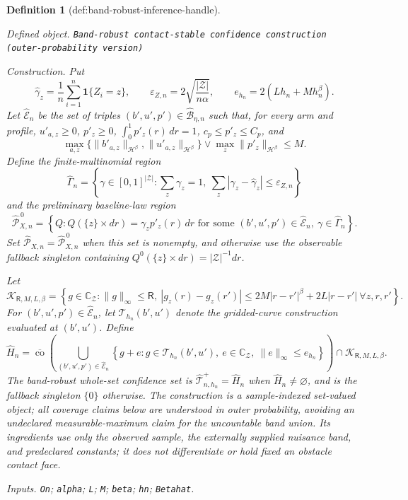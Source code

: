 \documentclass{article}
\newtheorem{definition}{Definition}
\begin{document}
\begin{definition}[def:band-robust-inference-handle]\label{def:band-robust-inference-handle}
\par\smallskip\noindent\emph{Defined object.} \texttt{Band-\allowbreak{}robust contact-\allowbreak{}stable confidence construction (outer-\allowbreak{}probability version)}
\par\smallskip\noindent\emph{Construction.} Put
\[
\widehat\gamma_z=\frac1n\sum_{i=1}^n\mathbf 1\{Z_i=z\},
\qquad
\varepsilon_{Z,n}=2\sqrt{\frac{|\mathcal Z|}{n\alpha}},
\qquad
e_{h_n}=2(Lh_n+Mh_n^\beta).
\]
Let \(\widehat{\mathcal E}_n\) be the set of triples \((b',u',p')\in\widehat{\mathcal B}_{\eta,n}\) such that, for every arm and profile, \(u'_{a,z}\geq0\), \(p'_z\geq0\), \(\int_0^1p'_z(r)\,dr=1\), \(c_p\leq p'_z\leq C_p\), and
\[
\max_{a,z}\{\|b'_{a,z}\|_{\mathcal H^\beta},\|u'_{a,z}\|_{\mathcal H^\beta}\}
\vee\max_z\|p'_z\|_{\mathcal H^\beta}\leq M.
\]
Define the finite-multinomial region
\[
\widehat\Gamma_n=
\left\{\gamma\in[0,1]^{|\mathcal Z|}:\sum_z\gamma_z=1,
\ \sum_z|\gamma_z-\widehat\gamma_z|\leq\varepsilon_{Z,n}\right\}
\]
and the preliminary baseline-law region
\[
\widehat{\mathcal P}^{\,0}_{X,n}
=\left\{Q:Q(\{z\}\times dr)=\gamma_zp'_z(r)\,dr
\text{ for some }(b',u',p')\in\widehat{\mathcal E}_n,
\ \gamma\in\widehat\Gamma_n\right\}.
\]
Set \(\widehat{\mathcal P}_{X,n}=\widehat{\mathcal P}^{\,0}_{X,n}\) when this set is nonempty, and otherwise use the observable fallback singleton containing \(Q^0(\{z\}\times dr)=|\mathcal Z|^{-1}dr\).

Let
\[
\mathcal K_{\mathsf R,M,L,\beta}
=\left\{g\in\mathbb C_{\mathcal Z}:\|g\|_\infty\leq\mathsf R,
\ |g_z(r)-g_z(r')|
\leq2M|r-r'|^\beta+2L|r-r'|\ \forall z,r,r'\right\}.
\]
For \((b',u',p')\in\widehat{\mathcal E}_n\), let \(\mathcal T_{h_n}(b',u')\) denote the gridded-curve construction evaluated at \((b',u')\).  Define
\[
\widehat H_n=
\overline{\operatorname{co}}\!\left(
\bigcup_{(b',u',p')\in\widehat{\mathcal E}_n}
\left\{g+e:g\in\mathcal T_{h_n}(b',u'),\ e\in\mathbb C_{\mathcal Z},\
\|e\|_\infty\leq e_{h_n}\right\}\right)
\cap\mathcal K_{\mathsf R,M,L,\beta}.
\]
The band-robust whole-set confidence set is \(\widehat{\mathcal T}_{n,h_n}^{+}=\widehat H_n\) when \(\widehat H_n\neq\varnothing\), and is the fallback singleton \(\{0\}\) otherwise.  The construction is a sample-indexed set-valued object; all coverage claims below are understood in outer probability, avoiding an undeclared measurable-maximum claim for the uncountable band union. Its ingredients use only the observed sample, the externally supplied nuisance band, and predeclared constants; it does not differentiate or hold fixed an obstacle contact face.
\par\smallskip\noindent\emph{Inputs.} \texttt{On}; \texttt{alpha}; \texttt{L}; \texttt{M}; \texttt{beta}; \texttt{hn}; \texttt{Betahat}.
\end{definition}
\end{document}
